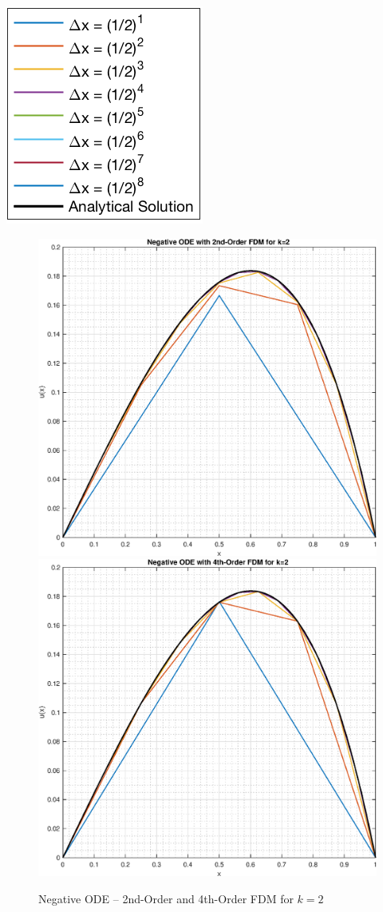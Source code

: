 \documentclass[10pt, reqno]{article}		%
\numberwithin{equation}{section}
\begin{document}
\begin{center}
	\includegraphics[height = 0.13\linewidth]{legend}
\end{center}

\newpage

\begin{figure}[H]
	\begin{center}
		\includegraphics[width = 0.49\linewidth]{negative_ode_order_2_k_2}
		\includegraphics[width = 0.49\linewidth]{negative_ode_order_4_k_2}
		\caption{Negative ODE -- 2nd-Order and 4th-Order FDM for $k = 2$}
	\end{center}
\end{figure}
\end{document}
